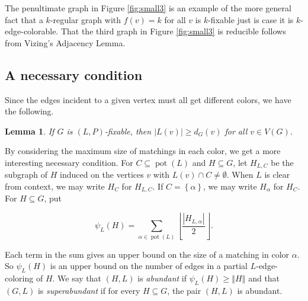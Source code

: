 \documentclass[12pt]{article}
\theoremstyle{plain}
\newtheorem{lem}[thm]{Lemma}
\theoremstyle{definition}
\theoremstyle{remark}
\newcommand{\set}[1]{\left\{ #1 \right\}}
\newcommand{\card}[1]{\left|#1\right|}
\newcommand{\size}[1]{\left\Vert#1\right\Vert}
\newcommand{\floor}[1]{\left\lfloor#1\right\rfloor}
\newcommand{\pot}{\operatorname{pot}}
\begin{document}
The penultimate graph in Figure \ref{fig:small3} is an example of the more general fact that a $k$-regular graph with $f(v) = k$ for all $v$ is $k$-fixable just is case it is $k$-edge-colorable.  That the third graph in Figure \ref{fig:small3} is reducible follows from Vizing's Adjacency Lemma.
\subsection{A necessary condition}
Since the edges incident to a given vertex must all get different colors, we have the following.

\begin{lem}\label{DegreeNecessaryCondition}
If $G$ is $(L, P)$-fixable, then $|L(v)| \ge d_G(v)$ for all $v \in V(G)$.
\end{lem}

By considering the maximum size of matchings in each color, we get a more interesting necessary condition.
For $C \subseteq \pot(L)$ and $H \subseteq G$, let $H_{L, C}$ be the
subgraph of $H$ induced on the vertices $v$ with $L(v) \cap C \ne \emptyset$. 
When $L$ is clear from context, we may write $H_C$ for $H_{L,C}$. If $C =
\set{\alpha}$, we may write $H_\alpha$ for $H_C$.  For $H \subseteq G$, put

\[\psi_L(H) = \sum_{\alpha \in \pot(L)} \floor{\frac{\card{H_{L, \alpha}}}{2}}.\]

Each term in the sum gives an upper bound on the size of a matching in color
$\alpha$. So $\psi_L(H)$ is an upper bound on the number of edges in a
partial $L$-edge-coloring of $H$.  We say that $(H, L)$ is \emph{abundant} if
$\psi_L(H) \ge \size{H}$ and that $(G,L)$ is \emph{superabundant} if for every
$H \subseteq G$, the pair $(H, L)$ is abundant.  
\end{document}
